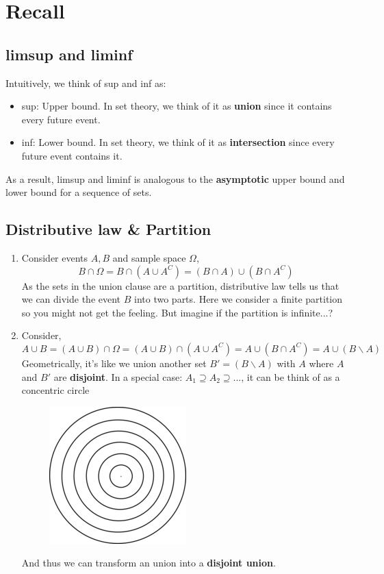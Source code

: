 \documentclass[11pt]{report}
\begin{document}
\section{Recall}
\subsection{limsup and liminf}
Intuitively, we think of sup and inf as:
\begin{itemize}
	\item sup: Upper bound. In set theory, we think of it as {\bf union} since it contains every future event.
	\item inf: Lower bound. In set theory, we think of it as {\bf intersection} since every future event contains it.
\end{itemize}
As a result, limsup and liminf is analogous to the {\bf asymptotic} upper bound and lower bound for a sequence of sets.

\subsection{Distributive law \& Partition}
\begin{enumerate}
	\item Consider events $A,B$ and sample space $\Omega$,
	$$B\cap\Omega=B\cap(A\cup A^C)=(B\cap A)\cup(B\cap A^C)$$
	As the sets in the union clause are a partition, distributive law tells us that we can divide the event $B$ into two parts. Here we consider a finite partition so you might not get the feeling. But imagine if the partition is infinite...?
	\item Consider,
	$$A\cup B=(A\cup B)\cap\Omega=(A\cup B)\cap(A\cup A^C)=A\cup(B\cap A^C)=A\cup (B\backslash A)$$
	Geometrically, it's like we union another set $B'=(B\backslash A)$ with $A$ where $A$ and $B'$ are {\bf disjoint}. In a special case: $A_1\supseteq A_2\supseteq ...$, it can be think of as a concentric circle
	\begin{figure}[h]
		\centering
		\includegraphics[scale=0.5]{concentric-circle.png}
	\end{figure}
	And thus we can transform an union into a {\bf disjoint union}.
\end{enumerate}
\end{document}
